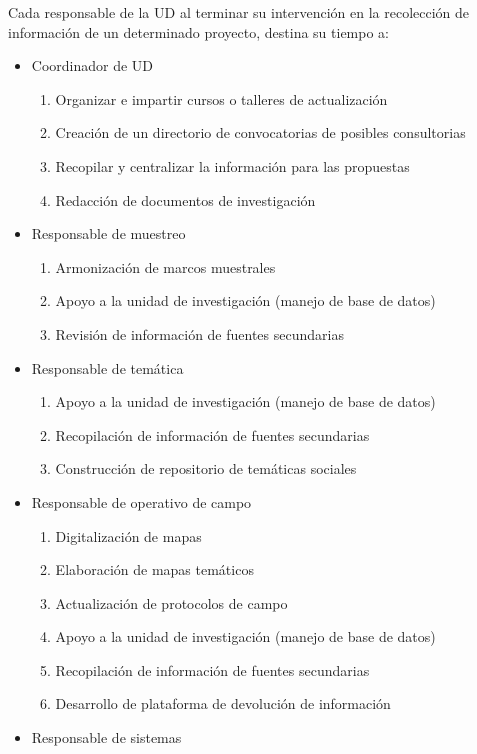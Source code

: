 \documentclass{article}
\begin{document}
Cada responsable de la UD al terminar su intervención en la recolección de información de un determinado proyecto, destina su tiempo a:

\begin{itemize}
\item Coordinador de UD
\begin{enumerate}
\item Organizar e impartir cursos o talleres de actualización
\item Creación de un directorio de convocatorias de posibles consultorias
\item Recopilar y centralizar la información para las propuestas
\item Redacción de documentos de investigación 
\end{enumerate}
\item Responsable de muestreo
\begin{enumerate}
\item Armonización de marcos muestrales
\item Apoyo a la unidad de investigación (manejo de base de datos)
\item Revisión de información de fuentes secundarias 
\end{enumerate} 
\item Responsable de temática
\begin{enumerate}
\item Apoyo a la unidad de investigación (manejo de base de datos)
\item Recopilación de información de fuentes secundarias 
\item Construcción de repositorio de temáticas sociales
\end{enumerate} 
\item Responsable de operativo de campo
\begin{enumerate}
\item Digitalización de mapas
\item Elaboración de mapas temáticos
\item Actualización de protocolos de campo 
\item Apoyo a la unidad de investigación (manejo de base de datos)
\item Recopilación de información de fuentes secundarias 
\item Desarrollo de plataforma de devolución de información
\end{enumerate} 
\item Responsable de sistemas
\begin{enumerate}

\end{enumerate}
\end{itemize}
\end{document}
